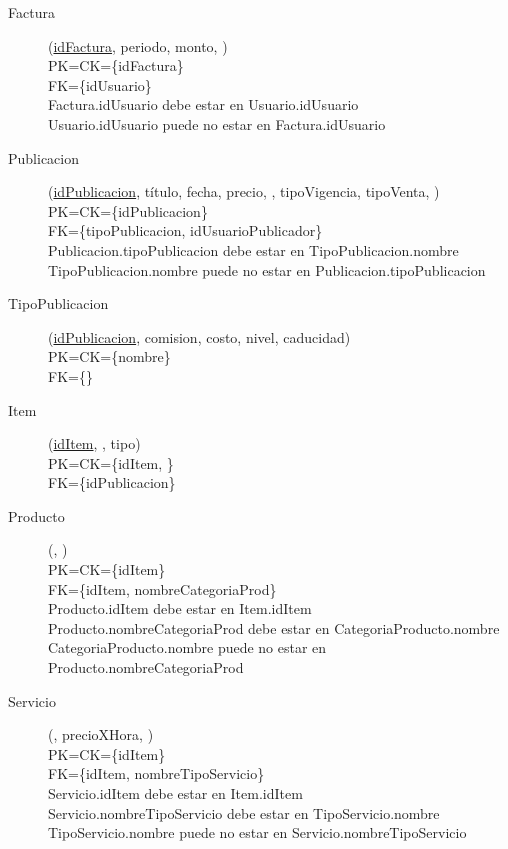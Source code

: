 \begin{description}
 \item[Factura](\underline{idFactura}, periodo, monto, )\\
PK=CK=\{idFactura\}\\
FK=\{idUsuario\}\\
Factura.idUsuario debe estar en Usuario.idUsuario\\
Usuario.idUsuario puede no estar en Factura.idUsuario

 \item[Publicacion](\underline{idPublicacion}, título, fecha, precio, , tipoVigencia, tipoVenta, )\\
PK=CK=\{idPublicacion\}\\
FK=\{tipoPublicacion, idUsuarioPublicador\}\\
Publicacion.tipoPublicacion debe estar en TipoPublicacion.nombre\\
TipoPublicacion.nombre puede no estar en Publicacion.tipoPublicacion

 \item[TipoPublicacion](\underline{idPublicacion}, comision, costo, nivel, caducidad)\\
PK=CK=\{nombre\}\\
FK=\{\}\\

 \item[Item](\underline{idItem}, , tipo)\\
PK=CK=\{idItem, \}\\
FK=\{idPublicacion\}\\

 \item[Producto](\underline{}, )\\
PK=CK=\{idItem\}\\
FK=\{idItem, nombreCategoriaProd\}\\
Producto.idItem debe estar en Item.idItem\\
Producto.nombreCategoriaProd debe estar en CategoriaProducto.nombre\\
CategoriaProducto.nombre puede no estar en Producto.nombreCategoriaProd

 \item[Servicio](\underline{}, precioXHora, )\\
PK=CK=\{idItem\}\\
FK=\{idItem, nombreTipoServicio\}\\
Servicio.idItem debe estar en Item.idItem\\
Servicio.nombreTipoServicio debe estar en TipoServicio.nombre\\
TipoServicio.nombre puede no estar en Servicio.nombreTipoServicio


\end{description}
